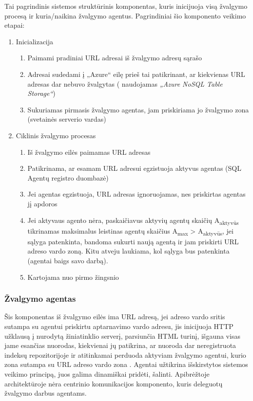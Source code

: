  Tai pagrindinis sistemos struktūrinis komponentas, kuris inicijuoja visą žvalgymo procesą ir kuria/naikina žvalgymo agentus. Pagrindiniai šio komponento veikimo etapai:
 \begin{enumerate}
     \item Inicializacija
     \begin{enumerate}
         \item Paimami pradiniai URL adresai iš žvalgymo adresų sąrašo
         \item Adresai sudedami į „Azure“ eilę prieš tai patikrinant, ar kiekvienas URL adresas dar nebuvo žvalgytas ( naudojamas \textit{„Azure NoSQL Table Storage“})
         \item Sukuriamas pirmasis žvalgymo agentas, jam priskiriama jo žvalgymo zona (svetainės serverio vardas)
     \end{enumerate}
     \item Ciklinis žvalgymo procesas
     \begin{enumerate}
         \item Iš žvalgymo eilės paimamas URL adresas
         \item Patikrinama, ar esamam URL adresui egzistuoja aktyvus agentas (SQL Agentų registro duombazė)
         \item Jei agentas egzistuoja, URL adresas ignoruojamas, nes priskirtas agentas jį apdoros
         \item Jei aktyvaus agento nėra, paskaičiavus aktyvių agentų skaičių A\textsubscript{aktyvūs} tikrinamas maksimalus leistinas agentų skaičius A\textsubscript{max} > A\textsubscript{aktyvūs}, jei sąlyga patenkinta, bandoma sukurti naują agentą ir jam priskirti URL adreso vardo zoną. Kitu atveju laukiama, kol sąlyga bus patenkinta (agentai baigs savo darbą).
         \item Kartojama nuo pirmo žingsnio
     \end{enumerate}
 \end{enumerate}
 
 \subsubsection{Žvalgymo agentas}

Šis komponentas iš žvalgymo eilės ima URL adresą, jei adreso vardo sritis sutampa su agentui priskirtu aptarnavimo vardo adresu, jis inicijuoja HTTP užklausą į nurodytą žiniatinklio serverį, parsiunčia HTML turinį, išgauna visas jame esančias nuorodas, kiekvienai jų patikrina, ar nuoroda dar neregistruota indeksų repozitorijoje ir atitinkamai perduoda aktyviam žvalgymo agentui, kurio zona sutampa su URL adreso vardo zona \cite{MercedCloudBasedWebCrawler}. Agentai užtikrina išskirstytos sistemos veikimo principą, juos galima dinamiškai pridėti, šalinti. Apibrėžtoje architektūroje nėra centrinio komunikacijos komponento, kuris deleguotų žvalgymo darbus agentams.

